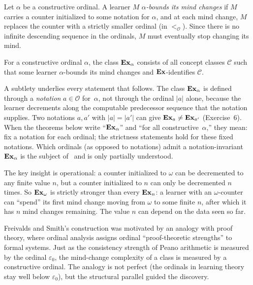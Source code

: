 \begin{defn}
\label{def:ordinal-mc}
Let $\alpha$ be a constructive ordinal.  A learner $M$
\emph{$\alpha$-bounds its mind changes} if $M$ carries a counter
initialized to some notation for $\alpha$, and at each mind change,
$M$ replaces the counter with a strictly smaller ordinal
(in $<_{\mathcal{O}}$).  Since there is no infinite descending
sequence in the ordinals, $M$ must eventually stop changing its mind.
\end{defn}

\begin{defn}[$\Ex_\alpha$]
\label{def:ex-alpha}
For a constructive ordinal $\alpha$, the class $\Ex_\alpha$ consists
of all concept classes $\mathcal{C}$ such that some learner
$\alpha$-bounds its mind changes and $\mathbf{Ex}$-identifies $\mathcal{C}$.
\end{defn}

\begin{remark}
\label{rem:notation-dependence}
A subtlety underlies every statement that follows.  The class
$\Ex_\alpha$ is defined through a \emph{notation} $a \in \mathcal{O}$
for~$\alpha$, not through the ordinal $|a|$ alone, because the learner
decrements along the computable predecessor sequence that the notation
supplies.  Two notations $a, a'$ with $|a| = |a'|$ can give
$\mathbf{Ex}_a \neq \mathbf{Ex}_{a'}$ (Exercise~6).  When the theorems below write
``$\Ex_\alpha$'' and ``for all constructive~$\alpha$,'' they mean: fix a
notation for each ordinal; the strictness statements hold for these
fixed notations.  Which ordinals (as opposed to notations) admit a
notation-invariant $\Ex_\alpha$ is the subject
of~\cite{MartinSharmaStephan2006} and is only partially understood.
\end{remark}

The key insight is operational: a counter initialized to $\omega$ can
be decremented to any finite value $n$, but a counter initialized to
$n$ can only be decremented $n$ times.  So $\mathbf{Ex}_\omega$ is strictly
stronger than every $\mathbf{Ex}_n$: a learner with an $\omega$-counter can
``spend'' its first mind change moving from $\omega$ to some finite $n$,
after which it has $n$ mind changes remaining.  The value $n$ can
depend on the data seen so far.

\begin{historical}
Freivalds and Smith's construction was motivated by an analogy with
proof theory, where ordinal analysis assigns ordinal ``proof-theoretic
strengths'' to formal systems.  Just as the consistency strength of
Peano arithmetic is measured by the ordinal $\varepsilon_0$, the
mind-change complexity of a class is measured by a constructive ordinal.
The analogy is not perfect (the ordinals in learning theory stay well
below $\varepsilon_0$), but the structural parallel guided the discovery.
\end{historical}

